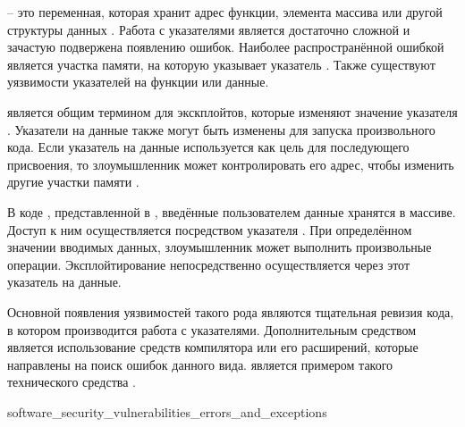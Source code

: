

%
 -- это переменная, которая хранит адрес функции, элемента массива или другой структуры данных . 
%
Работа с указателями является достаточно сложной и зачастую подвержена появлению ошибок. 
%
Наиболее распространённой ошибкой является  участка памяти, на которую указывает указатель . 
%
Также существуют уязвимости указателей на функции или данные.

%
 является общим термином для экскплойтов, которые изменяют значение указателя . 
%
Указатели на данные также могут быть изменены для запуска произвольного кода. 
%
Если указатель на данные используется как цель для последующего присвоения, то злоумышленник может контролировать его адрес, чтобы изменить другие участки памяти . 

%
В коде , представленной в , введённые пользователем данные хранятся в массиве.
%
Доступ к ним осуществляется посредством указателя . 
%
При определённом значении вводимых данных, злоумышленник может выполнить произвольные операции. 
%
Эксплойтирование непосредственно осуществляется через этот указатель на данные.

%
Основной  появления уязвимостей такого рода являются тщательная ревизия кода, в котором производится работа с указателями. 
%
Дополнительным средством является использование средств компилятора или его расширений, которые направлены на поиск ошибок данного вида. 
%
 является примером такого технического средства . 


	{software_security_vulnerabilities_errors_and_exceptions}

